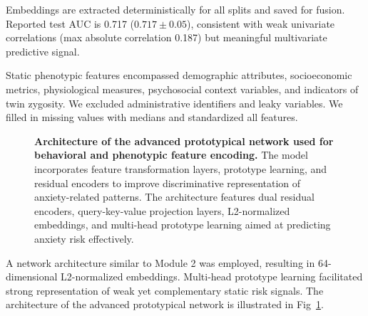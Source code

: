 \documentclass[10pt,letterpaper]{article}
\begin{document}
                                                                                                                  Embeddings are extracted deterministically for all splits and saved for fusion. Reported test AUC is 0.717 ($0.717\pm 0.05$), consistent with weak univariate correlations (max absolute correlation 0.187) but meaningful multivariate predictive signal.

                                                                                                                  Static phenotypic features encompassed demographic attributes, socioeconomic metrics, physiological measures, psychosocial context variables, and indicators of twin zygosity. We excluded administrative identifiers and leaky variables. We filled in missing values with medians and standardized all features.

                                                                                                                  \begin{figure}[!h]
                                                                                                                  \caption{\textbf{Architecture of the advanced prototypical network used for behavioral and phenotypic feature encoding.}
                                                                                                                  The model incorporates feature transformation layers, prototype learning, and residual encoders to improve discriminative representation of anxiety-related patterns. The architecture features dual residual encoders, query-key-value projection layers, L2-normalized embeddings, and multi-head prototype learning aimed at predicting anxiety risk effectively.}
                                                                                                                  \label{fig:proto_architecture}
                                                                                                                  \end{figure}

                                                                                                                  A network architecture similar to Module 2 was employed, resulting in 64-dimensional L2-normalized embeddings. Multi-head prototype learning facilitated strong representation of weak yet complementary static risk signals. The architecture of the advanced prototypical network is illustrated in Fig~\ref{fig:proto_architecture}.
\end{document}
